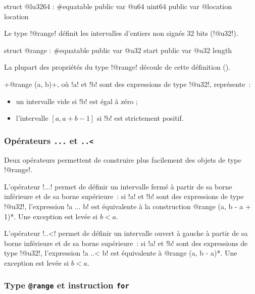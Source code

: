 

\begin{galgas4}
struct @lu3264 : #equatable {
  public var @u64 uint64
  public var @location location
}
\end{galgas4}



Le type \ggsq!@range! définit les intervalles d'entiers non signés 32 bits (\ggsq!@u32!).

\begin{galgas4}
struct @range : #equatable {
  public var @u32 start
  public var @u32 length
}
\end{galgas4}

La plupart des propriétés du type \ggsq!@range! découle de cette définition ().

\ggsq+@range (a, b)+, où \ggsq!a! et \ggsq!b! sont des expressions de type \ggsq!@u32!, représente~:
\begin{itemize}
  \item un intervalle vide si \ggsq!b! est égal à zéro ;
  \item l'intervalle $[a, a+b-1]$ si \ggsq!b! est strictement positif.
\end{itemize}



\subsubsection{Opérateurs \texttt{.{}.{}.} et \texttt{.{}.{}<}}

Deux opérateurs permettent de construire plus facilement des objets de type \ggsq!@range!.

L'opérateur \ggsq!...! permet de définir un intervalle fermé à partir de sa borne inférieure et de sa borne supérieure~: si \ggsq!a! et \ggsq!b! sont des expressions de type \ggsq!@u32!, l'expression \ggsq!a ... b! est équivalente à la construction \ggsq*@range (a, b - a + 1)*. Une exception est levée si $b < a$.

L'opérateur \ggsq!..<! permet de définir un intervalle ouvert à gauche à partir de sa borne inférieure et de sa borne supérieure~: si \ggsq!a! et \ggsq!b! sont des expressions de type \ggsq!@u32!, l'expression \ggsq!a ..< b! est équivalente à \ggsq*@range (a, b - a)*. Une exception est levée si $b < a$.

\subsubsection{Type \texttt{@range} et instruction \texttt{for}}

